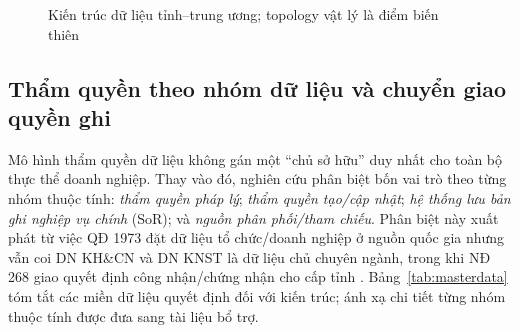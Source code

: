\begin{figure}[H]
\caption{Kiến trúc dữ liệu tỉnh--trung ương; topology vật lý là điểm biến thiên}
\label{fig:kientrucdulieu}
\end{figure}

\subsection{Thẩm quyền theo nhóm dữ liệu và chuyển giao quyền ghi}
\label{subsec:masterdata}

Mô hình thẩm quyền dữ liệu không gán một ``chủ sở hữu'' duy nhất cho toàn bộ thực thể doanh nghiệp. Thay vào đó, nghiên cứu phân biệt bốn vai trò theo từng nhóm thuộc tính: \emph{thẩm quyền pháp lý}; \emph{thẩm quyền tạo/cập nhật}; \emph{hệ thống lưu bản ghi nghiệp vụ chính} (SoR); và \emph{nguồn phân phối/tham chiếu}. Phân biệt này xuất phát từ việc QĐ 1973 đặt dữ liệu tổ chức/doanh nghiệp ở nguồn quốc gia nhưng vẫn coi DN KH\&CN và DN KNST là dữ liệu chủ chuyên ngành, trong khi NĐ 268 giao quyết định công nhận/chứng nhận cho cấp tỉnh \citep{nd268_2025,qd1973_2026}. Bảng~\ref{tab:masterdata} tóm tắt các miền dữ liệu quyết định đối với kiến trúc; ánh xạ chi tiết từng nhóm thuộc tính được đưa sang tài liệu bổ trợ.

